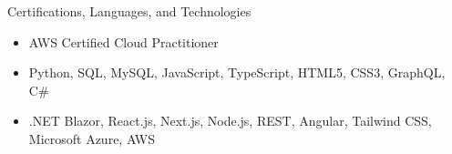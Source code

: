 \documentclass[]{mcdowellcv}
\begin{document}
	\begin{cvsection}{Certifications, Languages, and Technologies}
		\begin{cvsubsection}{}{}{}	
			\begin{itemize}
				\item AWS Certified Cloud Practitioner
				\item Python, SQL, MySQL, JavaScript, TypeScript, HTML5, CSS3, GraphQL, C\#
				\item .NET Blazor, React.js, Next.js, Node.js, REST, Angular, Tailwind CSS, Microsoft Azure, AWS
			\end{itemize}
		\end{cvsubsection}
	\end{cvsection}
	
\end{document}
